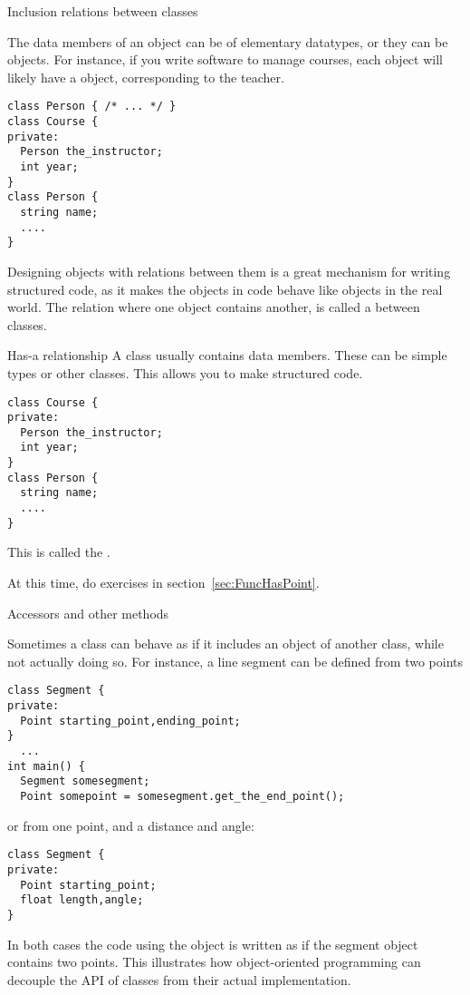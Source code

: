 
 {Inclusion relations between classes}
\label{sec:hasa}

The data members of an object can be of elementary datatypes, or they
can be objects. For instance, if you write software to manage courses,
each  object will likely have a  object,
corresponding to the teacher.
\begin{verbatim}
class Person { /* ... */ }
class Course {
private:
  Person the_instructor;
  int year;
}
class Person {
  string name;
  ....
}
\end{verbatim}

Designing objects with relations between them
is a great mechanism for writing structured code,
as it makes the objects in code behave like objects in the real world.
The relation where one object contains another, is called a
 between classes.

\begin{slide}{Has-a relationship}
  \label{sl:obj-hasa}
  A class usually contains data members. These can be simple types or
  other classes. This allows you to make structured code.
\begin{verbatim}
class Course {
private:
  Person the_instructor;
  int year;
}
class Person {
  string name;
  ....
}
\end{verbatim}
  This is
  called the .  
\end{slide}

At this time, do exercises in section~\ref{sec:FuncHasPoint}.

 {Accessors and other methods}

Sometimes a class can behave as if it includes an object of another
class, while not actually doing so. For instance, a line segment can
be defined from two points
\begin{verbatim}
class Segment {
private:
  Point starting_point,ending_point;
}
  ...
int main() {
  Segment somesegment;
  Point somepoint = somesegment.get_the_end_point();
\end{verbatim}
or from one point, and a distance and angle:
\begin{verbatim}
class Segment {
private:
  Point starting_point;
  float length,angle;
}
\end{verbatim}
In both cases the code using the object is written as if the segment
object contains two points.
This illustrates how object-oriented programming can decouple the
\ac{API} of classes from their actual implementation.

